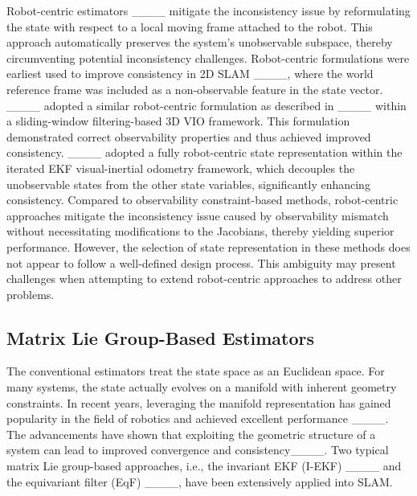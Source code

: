 Robot-centric estimators ____ mitigate the inconsistency issue by reformulating the state with respect to a local moving frame attached to the robot. This approach automatically preserves the system's unobservable subspace, thereby circumventing potential inconsistency challenges. Robot-centric formulations were earliest used to improve consistency in 2D SLAM ____, where the world reference frame was included as a non-observable feature in the state vector. ____ adopted a similar robot-centric formulation as described in ____ within a sliding-window filtering-based 3D VIO framework. This formulation demonstrated correct observability properties and thus achieved improved consistency. ____ adopted a fully robot-centric state representation within the iterated EKF visual-inertial odometry framework, which decouples the unobservable states from the other state variables, significantly enhancing consistency. Compared to observability constraint-based methods, robot-centric approaches mitigate the inconsistency issue caused by observability mismatch without necessitating modifications to the Jacobians, thereby yielding superior performance. However, the selection of state representation in these methods does not appear to follow a well-defined design process. This ambiguity may present challenges when attempting to extend robot-centric approaches to address other problems.




\subsection{Matrix Lie Group-Based Estimators}
The conventional estimators treat the state space as an Euclidean space. For many systems, the state actually evolves on a manifold with inherent geometry constraints. In recent years, leveraging the manifold representation has gained popularity in the field of robotics and achieved excellent performance ____. The advancements have shown that exploiting the geometric structure of a system can lead to improved convergence and consistency____. Two typical matrix Lie group-based approaches, i.e., the invariant EKF (I-EKF) ____ and the equivariant filter (EqF) ____, have been extensively applied into SLAM.

